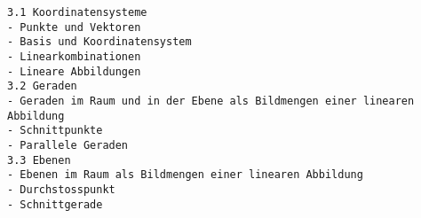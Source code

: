\begin{verbatim}
3.1 Koordinatensysteme
- Punkte und Vektoren
- Basis und Koordinatensystem
- Linearkombinationen
- Lineare Abbildungen
3.2 Geraden
- Geraden im Raum und in der Ebene als Bildmengen einer linearen Abbildung
- Schnittpunkte
- Parallele Geraden
3.3 Ebenen
- Ebenen im Raum als Bildmengen einer linearen Abbildung
- Durchstosspunkt
- Schnittgerade
\end{verbatim}
